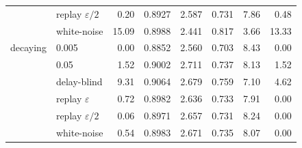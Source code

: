 \begin{tabular}{@{}llrrrrrr@{}}
 & replay $\varepsilon/2$ & 0.20 & 0.8927 & 2.587 & 0.731 & 7.86 & 0.48 \\
 & white-noise & 15.09 & 0.8988 & 2.441 & 0.817 & 3.66 & 13.33 \\
\addlinespace
decaying & 0.005 & 0.00 & 0.8852 & 2.560 & 0.703 & 8.43 & 0.00 \\
 & 0.05 & 1.52 & 0.9002 & 2.711 & 0.737 & 8.13 & 1.52 \\
 & delay-blind & 9.31 & 0.9064 & 2.679 & 0.759 & 7.10 & 4.62 \\
 & replay $\varepsilon$ & 0.72 & 0.8982 & 2.636 & 0.733 & 7.91 & 0.00 \\
 & replay $\varepsilon/2$ & 0.06 & 0.8971 & 2.657 & 0.731 & 8.24 & 0.00 \\
 & white-noise & 0.54 & 0.8983 & 2.671 & 0.735 & 8.07 & 0.00 \\
\bottomrule
\end{tabular}
